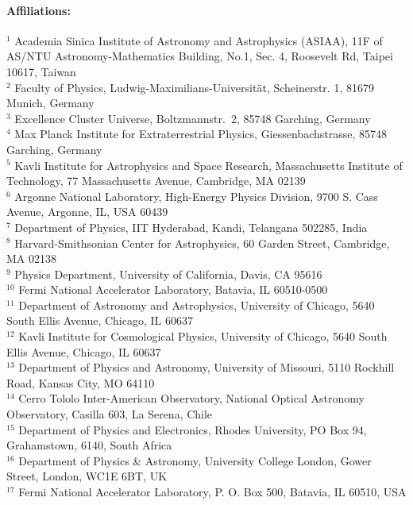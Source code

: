 \documentclass[useAMS,usenatbib,iop,numberedappendix]{mn2e}
\begin{document}
\paragraph*{Affiliations:}  
\scriptsize
$^{1}$ Academia Sinica Institute of Astronomy and Astrophysics (ASIAA), 11F of AS/NTU Astronomy-Mathematics Building, No.1, Sec. 4, Roosevelt Rd, Taipei 10617, Taiwan\\
$^{2}$ Faculty of Physics, Ludwig-Maximilians-Universit\"at, Scheinerstr. 1, 81679 Munich, Germany\\
$^{3}$ Excellence Cluster Universe, Boltzmannstr.\ 2, 85748 Garching, Germany\\
$^{4}$ Max Planck Institute for Extraterrestrial Physics, Giessenbachstrasse, 85748 Garching, Germany\\
$^{5}$ Kavli Institute for Astrophysics and Space Research, Massachusetts Institute of Technology, 77 Massachusetts Avenue, Cambridge, MA 02139\\
$^{6}$ Argonne National Laboratory, High-Energy Physics Division, 9700 S. Cass Avenue, Argonne, IL, USA 60439\\
$^{7}$ Department of Physics, IIT Hyderabad, Kandi, Telangana 502285, India\\
$^{8}$ Harvard-Smithsonian Center for Astrophysics, 60 Garden Street, Cambridge, MA 02138\\
$^{9}$ Physics Department, University of California, Davis, CA 95616\\
$^{10}$ Fermi National Accelerator Laboratory, Batavia, IL 60510-0500\\
$^{11}$ Department of Astronomy and Astrophysics, University of Chicago, 5640 South Ellis Avenue, Chicago, IL 60637\\
$^{12}$ Kavli Institute for Cosmological Physics, University of Chicago, 5640 South Ellis Avenue, Chicago, IL 60637\\
$^{13}$ Department of Physics and Astronomy, University of Missouri, 5110 Rockhill Road, Kansas City, MO 64110\\
$^{14}$ Cerro Tololo Inter-American Observatory, National Optical Astronomy Observatory, Casilla 603, La Serena, Chile\\
$^{15}$ Department of Physics and Electronics, Rhodes University, PO Box 94, Grahamstown, 6140, South Africa\\
$^{16}$ Department of Physics \& Astronomy, University College London, Gower Street, London, WC1E 6BT, UK\\
$^{17}$ Fermi National Accelerator Laboratory, P. O. Box 500, Batavia, IL 60510, USA\\
\end{document}
